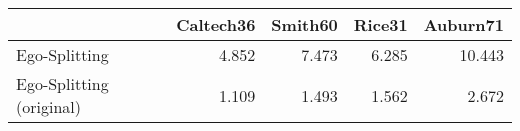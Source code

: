 \begin{tabular}{lrrrr}
\toprule
{} & Caltech36 & Smith60 & Rice31 & Auburn71 \\
\midrule
Ego-Splitting            &     4.852 &   7.473 &  6.285 &   10.443 \\
Ego-Splitting (original) &     1.109 &   1.493 &  1.562 &    2.672 \\
\bottomrule
\end{tabular}
